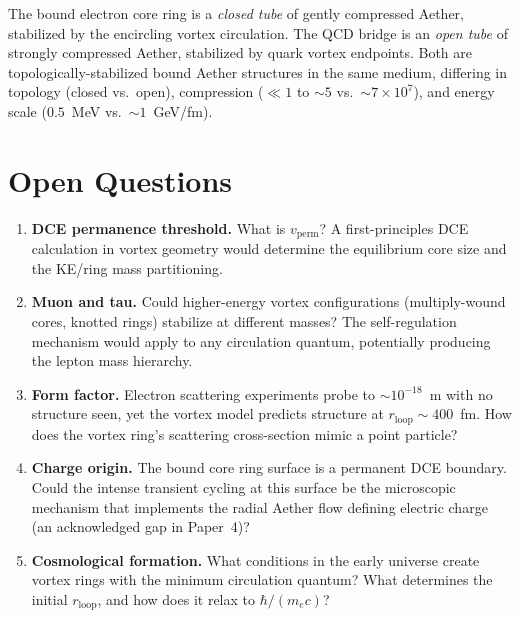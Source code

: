 \documentclass[12pt,letterpaper]{article}
\newcommand{\rloop}{r_{\mathrm{loop}}}
\begin{document}
The bound electron core ring is a \emph{closed tube} of gently compressed
Aether, stabilized by the encircling vortex circulation.  The QCD bridge is
an \emph{open tube} of strongly compressed Aether, stabilized by quark
vortex endpoints.  Both are topologically-stabilized bound Aether structures
in the same medium, differing in topology (closed vs.\ open), compression
($\ll 1$ to $\sim\!5$ vs.\ $\sim\!7 \times 10^7$), and energy scale ($0.5$~MeV
vs.\ $\sim\!1$~GeV/fm).


\section{Open Questions}
\label{sec:open}

\begin{enumerate}[leftmargin=2em]
  \item \textbf{DCE permanence threshold.}  What is $v_{\mathrm{perm}}$?
    A first-principles DCE calculation in vortex geometry would determine the
    equilibrium core size and the KE/ring mass partitioning.

  \item \textbf{Muon and tau.}  Could higher-energy vortex configurations
    (multiply-wound cores, knotted rings) stabilize at different masses?
    The self-regulation mechanism would apply to any circulation quantum,
    potentially producing the lepton mass hierarchy.

  \item \textbf{Form factor.}  Electron scattering experiments probe to
    $\sim\!10^{-18}$~m with no structure seen, yet the vortex model predicts
    structure at $\rloop \sim 400$~fm.  How does the vortex ring's
    scattering cross-section mimic a point particle?

  \item \textbf{Charge origin.}  The bound core ring surface is a permanent
    DCE boundary.  Could the intense transient cycling at this surface be
    the microscopic mechanism that implements the radial Aether flow defining
    electric charge (an acknowledged gap in Paper~4)?

  \item \textbf{Cosmological formation.}  What conditions in the early
    universe create vortex rings with the minimum circulation quantum?  What
    determines the initial $\rloop$, and how does it relax to
    $\hbar/(m_e c)$?
\end{enumerate}
\end{document}
